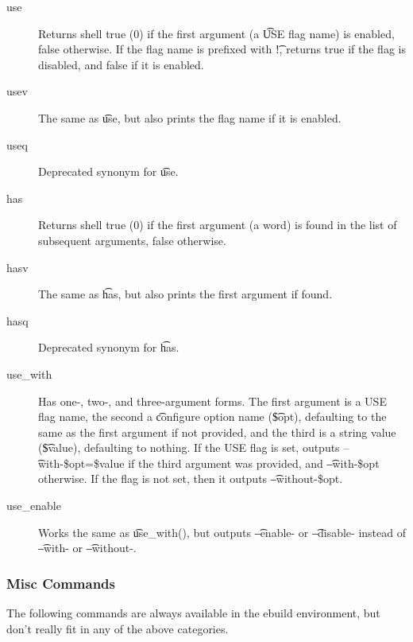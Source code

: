 \begin{description}
\item[use] Returns shell true (0) if the first argument (a \t{USE} flag name) is enabled, false
    otherwise.  If the flag name is prefixed with \t{!}, returns true if the flag is disabled, and
    false if it is enabled.
\item[usev] The same as \t{use}, but also prints the flag name if it is enabled.
\item[useq] Deprecated synonym for \t{use}.
\\
\item[has] Returns shell true (0) if the first argument (a word) is found in the list of subsequent
    arguments, false otherwise.
\item[hasv] The same as \t{has}, but also prints the first argument if found.
\item[hasq] Deprecated synonym for \t{has}.
\\
\item[use\_with] Has one-, two-, and three-argument forms. The first argument is a USE flag name,
    the second a \t{configure} option name (\t{\$opt}), defaulting to the same as the first argument
    if not provided, and the third is a string value (\t{\$value}), defaulting to nothing. If the
    USE flag is set, outputs \t{--with-\$opt=\$value} if the third argument was provided, and
    \t{--with-\$opt} otherwise. If the flag is not set, then it outputs \t{--without-\$opt}.

\item[use\_enable] Works the same as \t{use\_with()}, but outputs \t{--enable-} or \t{--disable-}
instead of \t{--with-} or \t{--without-}.
\end{description}

\subsubsection{Misc Commands}
The following commands are always available in the ebuild environment, but don't really fit in any
of the above categories.

